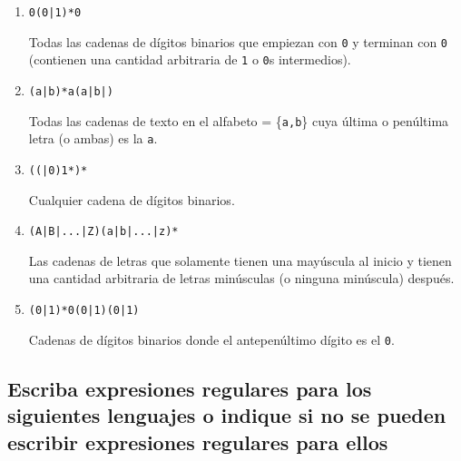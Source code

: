 \documentclass[a4paper, twoside, 12pt]{article}
\begin{document}
\begin{enumerate}
    \item \texttt{0(0|1)*0}
    
    Todas las cadenas de dígitos binarios que empiezan con \texttt{0} y terminan con \texttt{0} (contienen una cantidad arbitraria de \texttt{1} o \texttt{0}s intermedios).
    
    \item \texttt{(a|b)*a(a|b|\textepsilon)}
    
    Todas las cadenas de texto en el alfabeto \textSigma = \{\texttt{a,b}\} cuya última o penúltima letra (o ambas) es la \texttt{a}.
    
    \item \texttt{((\textepsilon|0)1*)*}

    Cualquier cadena de dígitos binarios.
    
    \item \texttt{(A|B|...|Z)(a|b|...|z)*}

    Las cadenas de letras que solamente tienen una mayúscula al inicio y tienen una cantidad arbitraria de letras minúsculas (o ninguna minúscula) después.
    
    \item \texttt{(0|1)*0(0|1)(0|1)}

    Cadenas de dígitos binarios donde el antepenúltimo dígito es el \texttt{0}.
\end{enumerate}


\subsection{Escriba expresiones regulares para los siguientes lenguajes o indique si no se pueden escribir expresiones regulares para ellos}
\end{document}
